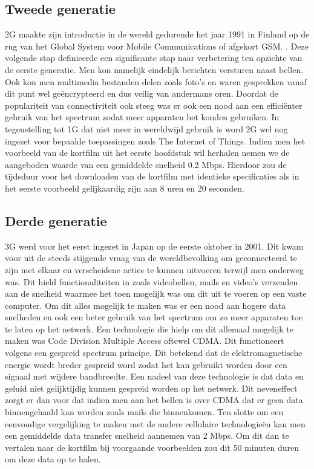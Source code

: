 \subsection{Tweede generatie}

2G maakte zijn introductie in de wereld gedurende het jaar 1991 in Finland op de rug van het Global System voor Mobile Communications of afgekort GSM. \autocite{Galazzo2020}. Deze volgende stap definieerde een significante stap naar verbetering ten opzichte van de eerste generatie. Men kon namelijk eindelijk berichten versturen naast bellen. Ook kon men multimedia bestanden delen zoals foto's en waren gesprekken vanaf dit punt wel geëncrypteerd en dus veilig van andermans oren. Doordat de populariteit van connectiviteit ook steeg was er ook een nood aan een efficiënter gebruik van het spectrum zodat meer apparaten het konden gebruiken. In tegenstelling tot 1G dat niet meer in wereldwijd gebruik is word 2G wel nog ingezet voor bepaalde toepassingen zoals The Internet of Things. \autocite{Henke2021} Indien men het voorbeeld van de kortfilm uit het eerste hoofdstuk wil herhalen nemen we de aangeboden waarde van een gemiddelde snelheid 0.2 Mbps. \autocite{Galazzo2020} Hierdoor zou de tijdsduur voor het downloaden van de kortfilm met identieke specificaties als in het eerste voorbeeld gelijkaardig zijn aan 8 uren en 20 seconden. \autocite{Wooding2024}

\subsection{Derde generatie}

3G werd voor het eerst ingezet in Japan op de eerste oktober in 2001. Dit kwam voor uit de steeds stijgende vraag van de wereldbevolking om geconnecteerd te zijn met elkaar en verscheidene acties te kunnen uitvoeren terwijl men onderweg was. Dit hield functionaliteiten in zoals videobellen, mails en video's verzenden aan de snelheid waarmee het toen mogelijk was om dit uit te voeren op een vaste computer. Om dit alles mogelijk te maken was er een nood aan hogere data snelheden en ook een beter gebruik van het spectrum om zo meer apparaten toe te laten op het netwerk. \autocite{Dulcey2020} Een technologie die hielp om dit allemaal mogelijk te maken was Code Division Multiple Access oftewel CDMA. Dit functioneert volgens een gespreid spectrum principe. Dit betekend dat de elektromagnetische energie wordt breder gespreid word zodat het kan gebruikt worden door een signaal met wijdere bandbreedte. Een nadeel van deze technologie is dat data en geluid niet gelijktijdig kunnen gespreid worden op het netwerk. Dit neveneffect zorgt er dan voor dat indien men aan het bellen is over CDMA dat er geen data binnengehaald kan worden zoals mails die binnenkomen. \autocite{Fendelman2021} Ten slotte om een eenvoudige vergelijking te maken met de andere cellulaire technologieën kan men een gemiddelde data transfer snelheid aannemen van 2 Mbps.\autocite{Galazzo2020} Om dit dan te vertalen naar de kortfilm bij voorgaande voorbeelden zou dit 50 minuten duren om deze data op te halen. \autocite{Wooding2024}

